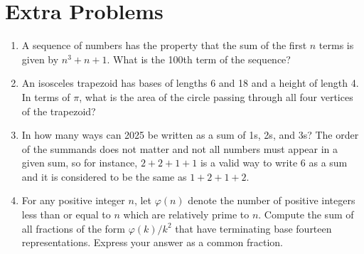 \documentclass{article}
\begin{document}
\newpage

\section*{Extra Problems}

\begin{enumerate}
\item A sequence of numbers has the property that the sum of the first $n$ terms is given by $n^3 + n + 1$. What is the 100th term of the sequence?\vspace{3cm}
\item An isosceles trapezoid has bases of lengths 6 and 18 and a height of length 4. In terms of $\pi$, what is the area of the circle passing through all four vertices of the trapezoid?\vspace{3cm}
\item In how many ways can 2025 be written as a sum of 1s, 2s, and 3s? The order of the summands does not matter and not all numbers must appear in a given sum, so for instance, $2 + 2 + 1 + 1$ is a valid way to write $6$ as a sum and it is considered to be the same as $1 + 2 + 1 + 2$.\vspace{3cm}
\item For any positive integer $n$, let $\varphi(n)$ denote the number of positive integers less than or equal to $n$ which are relatively prime to $n$. Compute the sum of all fractions of the form $\varphi(k)/k^2$ that have terminating base fourteen representations. Express your answer as a common fraction.
\end{enumerate}
\end{document}
